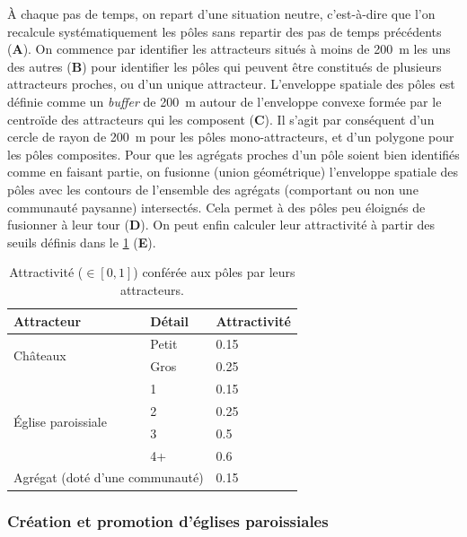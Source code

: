 À chaque pas de temps, on repart d'une situation \og neutre\fg{}, c'est-à-dire que l'on recalcule systématiquement les pôles sans repartir des pas de temps précédents (\textbf{A}).
On commence par identifier les attracteurs situés à moins de 200~m les uns des autres (\textbf{B}) pour identifier les pôles qui peuvent être constitués de plusieurs attracteurs proches, ou d'un unique attracteur.
L'enveloppe spatiale des pôles est définie comme un \textit{buffer} de 200~m autour de l'enveloppe convexe formée par le centroïde des attracteurs qui les composent (\textbf{C}).
Il s'agit par conséquent d'un cercle de rayon de 200~m pour les pôles mono-attracteurs, et d'un polygone pour les pôles composites.
Pour que les agrégats proches d'un pôle soient bien identifiés comme en faisant partie, on fusionne (union géométrique) l'enveloppe spatiale des pôles avec les contours de l'ensemble des agrégats (comportant ou non une communauté paysanne) intersectés.
Cela permet à des pôles peu éloignés de fusionner à leur tour (\textbf{D}).
On peut enfin calculer leur attractivité à partir des seuils définis dans le \cref{tab:attraction-poles} (\textbf{E}).

\begin{table}[H]
	\centering
	{\renewcommand{\arraystretch}{1}%
	\begin{tabular}{|l|l|l|}\hline
		\textbf{Attracteur} & \textbf{Détail} & \textbf{Attractivité} \\ \hline
		\multirow{2}{*}{Châteaux} & Petit & 0.15 \\
		& Gros & 0.25 \\ \hline
		\multirow{4}{*}{Église paroissiale} & 1 & 0.15 \\
		& 2 & 0.25 \\
		& 3 & 0.5 \\
		& 4+ & 0.6 \\ \hline
		\multicolumn{2}{|l|}{Agrégat (doté d'une communauté)} & 0.15 \\ \hline
	\end{tabular}}
\caption[Attractivité conférée aux pôles par leurs attracteurs.]{Attractivité ($\in [0,1]$) conférée aux pôles par leurs attracteurs.}
\label{tab:attraction-poles}
\end{table}
\clearpage


	
\subsubsection{Création et promotion d'églises paroissiales \label{sssec:paroisses}}


